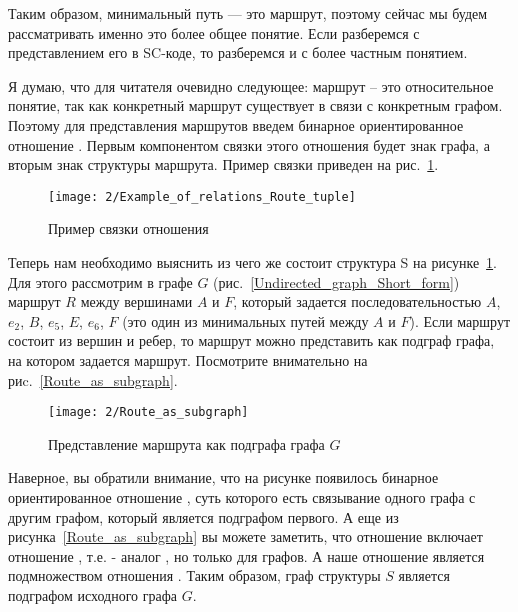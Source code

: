 Таким образом, минимальный путь — это маршрут, поэтому сейчас мы будем
рассматривать именно это более общее понятие. Если разберемся с
представлением его в SC-коде, то разберемся и с более частным
понятием.

Я думаю, что для читателя очевидно следующее: маршрут – это
относительное понятие, так как конкретный маршрут существует в связи с
конкретным графом. Поэтому для представления маршрутов введем бинарное
ориентированное отношение . Первым компонентом связки
этого отношения будет знак графа, а вторым знак структуры
маршрута. Пример связки приведен на
рис.~\ref{fig:Example_of_relations_Route_tuple}.

\begin{figure}[h]
  \centering
  \texttt{[image: 2/Example\_of\_relations\_Route\_tuple]}
  \caption{Пример связки отношения }
  \label{fig:Example_of_relations_Route_tuple}
\end{figure}

Теперь нам необходимо выяснить из чего же состоит структура S на
рисунке~\ref{fig:Example_of_relations_Route_tuple}. Для этого
рассмотрим в графе $G$ (рис.~\ref{Undirected_graph_Short_form})
маршрут $R$ между вершинами $A$ и $F$, который задается последовательностью
$A$, $e_2$, $B$, $e_5$, $E$, $e_6$, $F$ (это один из минимальных путей между $A$ и
$F$). Если маршрут состоит из вершин и ребер, то маршрут можно
представить как подграф графа, на котором задается маршрут. Посмотрите
внимательно на риc.~\ref{Route_as_subgraph}.

\begin{figure}
  \centering
  \texttt{[image: 2/Route\_as\_subgraph]}
  \caption{Представление маршрута как подграфа графа $G$}
  \label{fig:Route_as_subgraph}
\end{figure}

Наверное, вы обратили внимание, что на рисунке появилось бинарное
ориентированное отношение , суть которого есть
связывание одного графа с другим графом, который является подграфом
первого. А еще из рисунка~\ref{Route_as_subgraph} вы можете заметить,
что отношение  включает отношение ,
т.е.  - аналог , но только для
графов. А наше отношение  является подмножеством
отношения . Таким образом, граф структуры $S$ является
подграфом исходного графа $G$.

